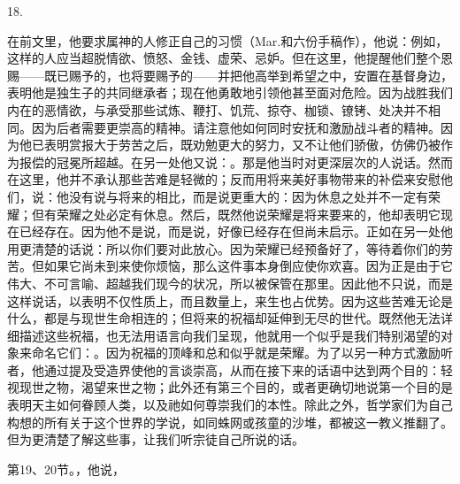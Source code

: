 18.  \par

在前文里，他要求属神的人修正自己的习惯（Mar.和六份手稿作），他说：例如，这样的人应当超脱情欲、愤怒、金钱、虚荣、忌妒。但在这里，他提醒他们整个恩赐——既已赐予的，也将要赐予的——并把他高举到希望之中，安置在基督身边，表明他是独生子的共同继承者；现在他勇敢地引领他甚至面对危险。因为战胜我们内在的恶情欲，与承受那些试炼、鞭打、饥荒、掠夺、枷锁、镣铐、处决并不相同。因为后者需要更崇高的精神。请注意他如何同时安抚和激励战斗者的精神。因为他已表明赏报大于劳苦之后，既劝勉更大的努力，又不让他们骄傲，仿佛仍被作为报偿的冠冕所超越。在另一处他又说：。那是他当时对更深层次的人说话。然而在这里，他并不承认那些苦难是轻微的；反而用将来美好事物带来的补偿来安慰他们，说：他没有说与将来的相比，而是说更重大的：因为休息之处并不一定有荣耀；但有荣耀之处必定有休息。然后，既然他说荣耀是将来要来的，他却表明它现在已经存在。因为他不是说，而是说，好像已经存在但尚未启示。正如在另一处他用更清楚的话说：所以你们要对此放心。因为荣耀已经预备好了，等待着你们的劳苦。但如果它尚未到来使你烦恼，那么这件事本身倒应使你欢喜。因为正是由于它伟大、不可言喻、超越我们现今的状况，所以被保管在那里。因此他不只说，而是这样说话，以表明不仅性质上，而且数量上，来生也占优势。因为这些苦难无论是什么，都是与现世生命相连的；但将来的祝福却延伸到无尽的世代。既然他无法详细描述这些祝福，也无法用语言向我们呈现，他就用一个似乎是我们特别渴望的对象来命名它们：。因为祝福的顶峰和总和似乎就是荣耀。为了以另一种方式激励听者，他通过提及受造界使他的言谈崇高，从而在接下来的话语中达到两个目的：轻视现世之物，渴望来世之物；此外还有第三个目的，或者更确切地说第一个目的是表明天主如何眷顾人类，以及祂如何尊崇我们的本性。除此之外，哲学家们为自己构想的所有关于这个世界的学说，如同蛛网或孩童的沙堆，都被这一教义推翻了。但为更清楚了解这些事，让我们听宗徒自己所说的话。\par

第19、20节。，他说，\par

